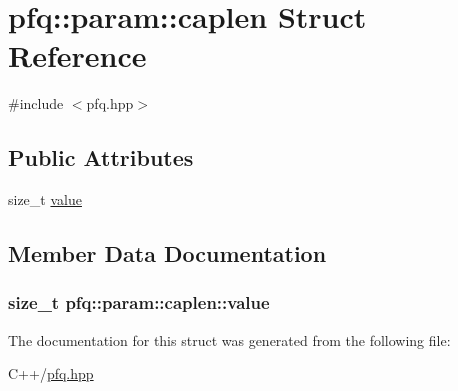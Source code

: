 \hypertarget{structpfq_1_1param_1_1caplen}{\section{pfq\+:\+:param\+:\+:caplen Struct Reference}
\label{structpfq_1_1param_1_1caplen}
}


{\ttfamily \#include $<$pfq.\+hpp$>$}

\subsection*{Public Attributes}
\begin{DoxyCompactItemize}
\item 
size\+\_\+t \hyperlink{structpfq_1_1param_1_1caplen_ad706d73fbbd8342fea36e920253aaa02}{value}
\end{DoxyCompactItemize}


\subsection{Member Data Documentation}
\hypertarget{structpfq_1_1param_1_1caplen_ad706d73fbbd8342fea36e920253aaa02}{
\subsubsection[{value}]{\setlength{\rightskip}{0pt plus 5cm}size\+\_\+t pfq\+::param\+::caplen\+::value}}\label{structpfq_1_1param_1_1caplen_ad706d73fbbd8342fea36e920253aaa02}


The documentation for this struct was generated from the following file\+:\begin{DoxyCompactItemize}
\item 
C++/\hyperlink{pfq_8hpp}{pfq.\+hpp}\end{DoxyCompactItemize}
